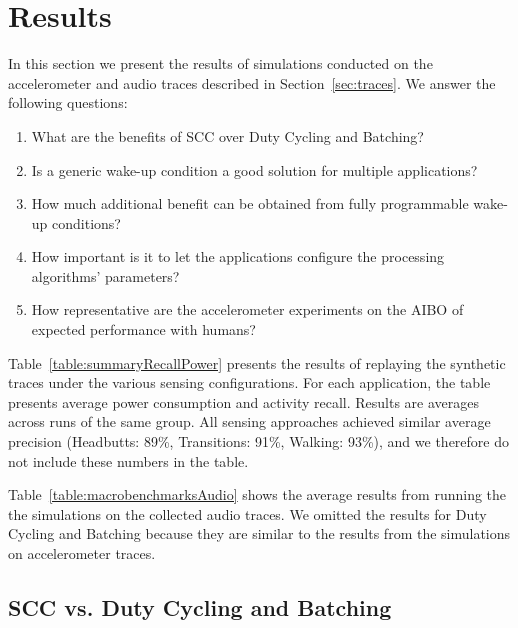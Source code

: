 

\section{Results}
\label{sec:results}

In this section we present the results of simulations conducted
on the accelerometer and audio traces described in 
Section~\ref{sec:traces}.  We answer the following questions:

\begin{enumerate}
\setlength{\itemsep}{-3pt}  

\item What are the benefits of SCC over Duty Cycling and
  Batching?

\item Is a generic wake-up condition a good solution for multiple 
  applications?

\item How much additional benefit can be obtained from fully
  programmable wake-up conditions?

\item How important is it to let the applications configure
  the processing algorithms' parameters?

\item How representative are the accelerometer experiments on 
  the AIBO of expected performance with humans?
  
\end{enumerate}

Table~\ref{table:summaryRecallPower} presents the results of replaying
the synthetic traces under the various sensing configurations.  For 
each application, the table
presents average power consumption and activity recall.  Results are
averages across runs of the same group.  All sensing approaches achieved similar
average precision (Headbutts: 89\%, Transitions: 91\%, Walking:
93\%), and we therefore do not include these numbers in the table.

Table~\ref{table:macrobenchmarksAudio} shows the average results from running the
the simulations on the collected audio traces.  We omitted the results
for Duty Cycling and Batching because they are similar to the results from
the simulations on accelerometer traces.

\subsection{SCC vs. Duty Cycling and Batching}

